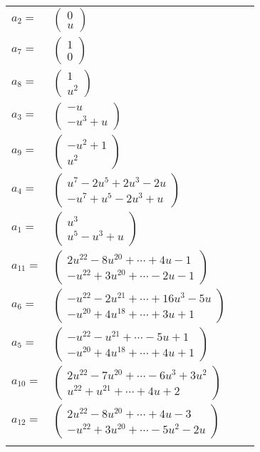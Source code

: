 \documentclass[1p]{elsarticle_modified}
\theoremstyle{definition}
\begin{document}
\begin{tabular}{m{7pt} m{180pt} m{7pt} m{180pt} }
\flushright $a_{2}=$&$\begin{pmatrix}0\\u\end{pmatrix}$ \\
\flushright $a_{7}=$&$\begin{pmatrix}1\\0\end{pmatrix}$ \\
\flushright $a_{8}=$&$\begin{pmatrix}1\\u^2\end{pmatrix}$ \\
\flushright $a_{3}=$&$\begin{pmatrix}- u\\- u^3+u\end{pmatrix}$ \\
\flushright $a_{9}=$&$\begin{pmatrix}- u^2+1\\u^2\end{pmatrix}$ \\
\flushright $a_{4}=$&$\begin{pmatrix}u^7-2 u^5+2 u^3-2 u\\- u^7+u^5-2 u^3+u\end{pmatrix}$ \\
\flushright $a_{1}=$&$\begin{pmatrix}u^3\\u^5- u^3+u\end{pmatrix}$ \\
\flushright $a_{11}=$&$\begin{pmatrix}2 u^{22}-8 u^{20}+\cdots+4 u-1\\- u^{22}+3 u^{20}+\cdots-2 u-1\end{pmatrix}$ \\
\flushright $a_{6}=$&$\begin{pmatrix}- u^{22}-2 u^{21}+\cdots+16 u^3-5 u\\- u^{20}+4 u^{18}+\cdots+3 u+1\end{pmatrix}$ \\
\flushright $a_{5}=$&$\begin{pmatrix}- u^{22}- u^{21}+\cdots-5 u+1\\- u^{20}+4 u^{18}+\cdots+4 u+1\end{pmatrix}$ \\
\flushright $a_{10}=$&$\begin{pmatrix}2 u^{22}-7 u^{20}+\cdots-6 u^3+3 u^2\\u^{22}+u^{21}+\cdots+4 u+2\end{pmatrix}$ \\
\flushright $a_{12}=$&$\begin{pmatrix}2 u^{22}-8 u^{20}+\cdots+4 u-3\\- u^{22}+3 u^{20}+\cdots-5 u^2-2 u\end{pmatrix}$\\&\end{tabular}
\end{document}
